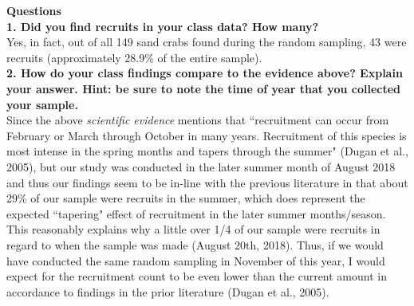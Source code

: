 \documentclass[11pt]{article}
\begin{document}
{\bf Questions} \\
{\bf 1. Did you find recruits in your class data? How many?} \\
Yes, in fact, out of all 149 sand crabs found during the random sampling, 43 were recruits (approximately 28.9\% of the entire sample). \\

{\bf 2. How do your class findings compare to the evidence above? Explain your answer. Hint: be sure to note the time of year that you collected your sample.} \\
Since the above {\it scientific evidence} mentions that ``recruitment can occur from February or March through October in many years. Recruitment of this species is most intense in the spring months and tapers through the summer" (Dugan et al., 2005), but our study was conducted in the later summer month of August 2018 and thus our findings seem to be in-line with the previous literature in that about 29\% of our sample were recruits in the summer, which does represent the expected ``tapering" effect of recruitment in the later summer months/season. This reasonably explains why a little over 1/4 of our sample were recruits in regard to when the sample was made (August 20th, 2018). Thus, if we would have conducted the same random sampling in November of this year, I would expect for the recruitment count to be even lower than the current amount in accordance to findings in the prior literature (Dugan et al., 2005).  
\end{document}
